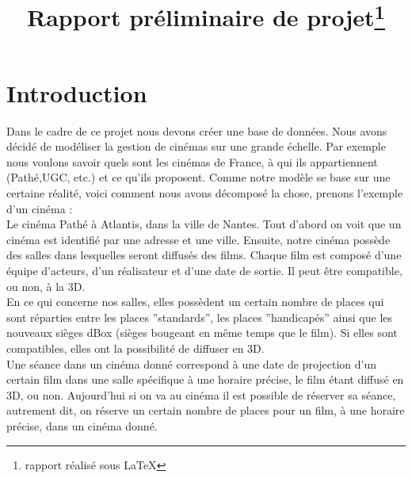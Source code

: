 \documentclass[a4paper,sffamily,12pt]{article}
\title{\vspace{\fill}\LARGE\bfseries\sffamily Rapport préliminaire de projet\protect\footnote{rapport réalisé sous \LaTeX} \vspace{\fill}}
\begin{document}
	\date{} %
	\maketitle %

	\thispagestyle{fancy} %
	
	\newpage
			
	\renewcommand{\contentsname}{Sommaire}
	\tableofcontents
	
	\newpage
	
	\section{Introduction}
		
		\vspace{0.5cm}
		
		Dans le cadre de ce projet nous devons créer une base de données. Nous avons décidé de modéliser la gestion de cinémas sur une grande échelle. Par exemple nous voulons savoir quels sont les cinémas de France, à qui ils appartiennent (Pathé,UGC, etc.) et ce qu'ils proposent. Comme notre modèle se base sur une certaine réalité, voici comment nous avons décomposé la chose, prenons  l'exemple d'un cinéma : \\
		\indent Le cinéma Pathé à Atlantis, dans la ville de Nantes. Tout d'abord on voit que un cinéma est identifié par une adresse et une ville. Ensuite, notre cinéma possède des salles dans lesquelles seront diffusés des films. Chaque film est composé d'une équipe d'acteurs, d'un réalisateur et d'une date de sortie. Il peut être compatible, ou non, à la 3D. \\ 				
		\indent En ce qui concerne nos salles, elles possèdent un certain nombre de places qui sont réparties entre les places ''standards'', les places ''handicapés'' ainsi que les nouveaux sièges dBox (sièges bougeant en même temps que le film). Si elles sont compatibles, elles ont la possibilité de diffuser en 3D. \\
		\indent Une séance dans un cinéma donné correspond à une date de projection d'un certain film dans une salle spécifique à une horaire précise, le film étant diffusé en 3D, ou non. Aujourd'hui si on va au cinéma il est possible de réserver sa séance, autrement dit, on réserve un certain nombre de places pour un film, à une horaire précise, dans un cinéma donné. 

		\vspace{0.5cm}
								
\end{document}
